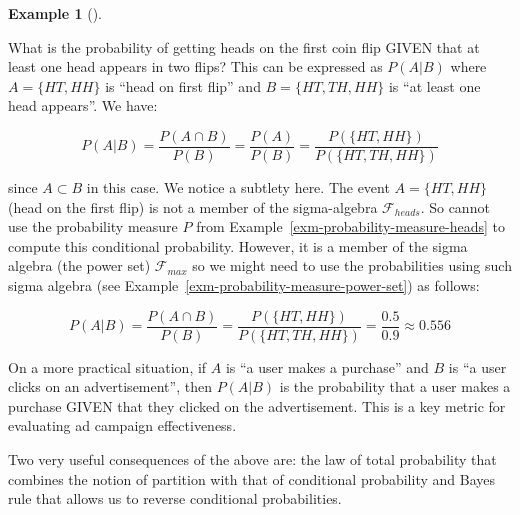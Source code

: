 \documentclass[
  letterpaper,
  DIV=11,
  numbers=noendperiod]{scrreport}
\theoremstyle{definition}
\newtheorem{example}{Example}[chapter]
\theoremstyle{plain}
\theoremstyle{plain}
\theoremstyle{definition}
\theoremstyle{remark}
\begin{document}
\begin{tcolorbox}[enhanced jigsaw, opacitybacktitle=0.6, bottomtitle=1mm, opacityback=0, toprule=.15mm, colbacktitle=quarto-callout-note-color!10!white, colback=white, left=2mm, title={Example of Conditional Probability}, breakable, rightrule=.15mm, leftrule=.75mm, titlerule=0mm, colframe=quarto-callout-note-color-frame, arc=.35mm, coltitle=black, toptitle=1mm, bottomrule=.15mm]

\begin{example}[]\protect\hypertarget{exm-cond-probability}{}\label{exm-cond-probability}

What is the probability of getting heads on the first coin flip GIVEN
that at least one head appears in two flips? This can be expressed as
\(P(A|B)\) where \(A=\{HT,HH\}\) is ``head on first flip'' and
\(B=\{HT,TH,HH\}\) is ``at least one head appears''. We have:

\[
P(A|B) = \frac{P(A \cap B)}{P(B)} =\frac{P(A)}{P(B)}= \frac{P(\{HT,HH\})}{P(\{HT,TH,HH\})} 
\]

since \(A\subset B\) in this case. We notice a subtlety here. The event
\(A =\{HT,HH\}\) (head on the first flip) is not a member of the
sigma-algebra \(\mathcal F_{heads}\). So cannot use the probability
measure \(P\) from Example~\ref{exm-probability-measure-heads} to
compute this conditional probability. However, it is a member of the
sigma algebra (the power set) \(\mathcal F_{max}\) so we might need to
use the probabilities using such sigma algebra (see
Example~\ref{exm-probability-measure-power-set}) as follows:

\[
P(A|B) = \frac{P(A \cap B)}{P(B)} = \frac{P(\{HT,HH\})}{P(\{HT,TH,HH\})} = 
 \frac{0.5}{0.9} \approx 0.556
\]

On a more practical situation, if \(A\) is ``a user makes a purchase''
and \(B\) is ``a user clicks on an advertisement'', then \(P(A|B)\) is
the probability that a user makes a purchase GIVEN that they clicked on
the advertisement. This is a key metric for evaluating ad campaign
effectiveness.

\end{example}

\end{tcolorbox}

Two very useful consequences of the above are: the law of total
probability that combines the notion of partition with that of
conditional probability and Bayes rule that allows us to reverse
conditional probabilities.
\end{document}
